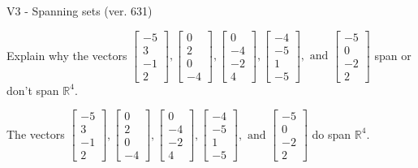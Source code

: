 \begin{exercise}
  \begin{exerciseTitle}V3 - Spanning sets (ver. 631)\end{exerciseTitle}
  \begin{exerciseStatement}
    Explain why the vectors \(\left[\begin{array}{r}
-5 \\
3 \\
-1 \\
2
\end{array}\right] , \left[\begin{array}{r}
0 \\
2 \\
0 \\
-4
\end{array}\right] , \left[\begin{array}{r}
0 \\
-4 \\
-2 \\
4
\end{array}\right] , \left[\begin{array}{r}
-4 \\
-5 \\
1 \\
-5
\end{array}\right] , \text{ and } \left[\begin{array}{r}
-5 \\
0 \\
-2 \\
2
\end{array}\right]\) span or don't span \(\mathbb{R}^4\). 
	


  \end{exerciseStatement}
  \begin{exerciseAnswer}
   The vectors \(\left[\begin{array}{r}
-5 \\
3 \\
-1 \\
2
\end{array}\right] , \left[\begin{array}{r}
0 \\
2 \\
0 \\
-4
\end{array}\right] , \left[\begin{array}{r}
0 \\
-4 \\
-2 \\
4
\end{array}\right] , \left[\begin{array}{r}
-4 \\
-5 \\
1 \\
-5
\end{array}\right] , \text{ and } \left[\begin{array}{r}
-5 \\
0 \\
-2 \\
2
\end{array}\right]\) 
  	 do  
	span \(\mathbb{R}^4\).
  



\end{exerciseAnswer}
\end{exercise}
